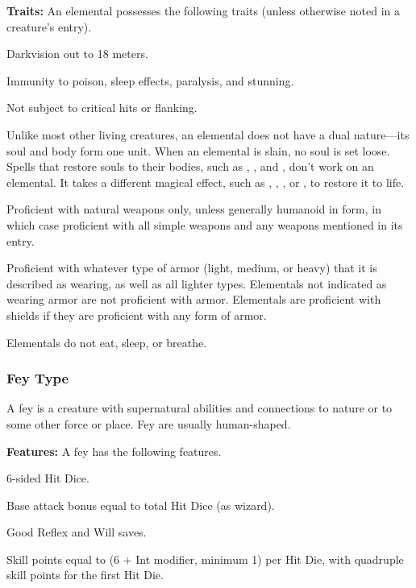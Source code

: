 \textbf{Traits:} An elemental possesses the following traits (unless otherwise noted in a creature's entry).
\begin{itemize*}
\item Darkvision out to 18 meters.
\item Immunity to poison, sleep effects, paralysis, and stunning.
\item Not subject to critical hits or flanking.
\item Unlike most other living creatures, an elemental does not have a dual nature—its soul and body form one unit. When an elemental is slain, no soul is set loose. Spells that restore souls to their bodies, such as , , and , don't work on an elemental. It takes a different magical effect, such as , , , or , to restore it to life.
\item Proficient with natural weapons only, unless generally humanoid in form, in which case proficient with all simple weapons and any weapons mentioned in its entry.
\item Proficient with whatever type of armor (light, medium, or heavy) that it is described as wearing, as well as all lighter types. Elementals not indicated as wearing armor are not proficient with armor. Elementals are proficient with shields if they are proficient with any form of armor.
\item Elementals do not eat, sleep, or breathe.
\end{itemize*}

\subsubsection{Fey Type}
A fey is a creature with supernatural abilities and connections to nature or to some other force or place. Fey are usually human-shaped.

\textbf{Features:} A fey has the following features.
\begin{itemize*}
\item 6-sided Hit Dice.
\item Base attack bonus equal to \onehalf total Hit Dice (as wizard).
\item Good Reflex and Will saves.
\item Skill points equal to (6 + Int modifier, minimum 1) per Hit Die, with quadruple skill points for the first Hit Die.
\end{itemize*}

